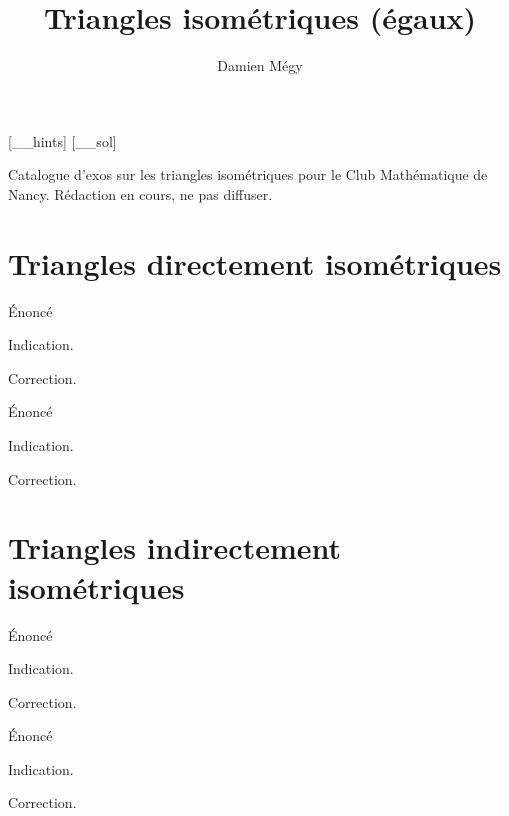 





[_\jobname_hints]
[_\jobname_sol]


\title{Triangles isométriques (\og égaux\fg)}
\author{Damien Mégy}
\maketitle

Catalogue d'exos sur les triangles isométriques pour le Club Mathématique de Nancy. Rédaction en cours, ne pas diffuser. 

\tableofcontents

\section{Triangles directement isométriques}

\begin{exo}
Énoncé
\begin{hint}
Indication.
\end{hint}
\begin{sol}
Correction.
\end{sol}
\end{exo}

\begin{exo}
Énoncé
\begin{hint}
Indication.
\end{hint}
\begin{sol}
Correction.
\end{sol}
\end{exo}


\section{Triangles indirectement isométriques}


\begin{exo}
Énoncé
\begin{hint}
Indication.
\end{hint}
\begin{sol}
Correction.
\end{sol}
\end{exo}

\begin{exo}
Énoncé
\begin{hint}
Indication.
\end{hint}
\begin{sol}
Correction.
\end{sol}
\end{exo}






\indications
\correction



